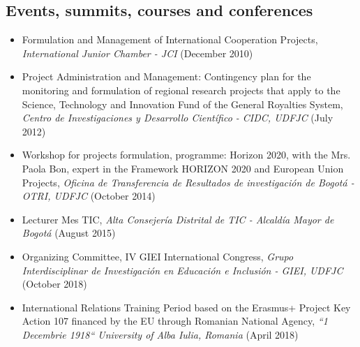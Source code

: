 \documentclass[overlapped,line,final]{../../templates/MichaelDeCorteCV/lib/res}
\begin{document}
\begin{resume}
\section{\sc Events, summits, courses and conferences}
\vspace{0.5cm}
\begin{itemize}
	\item Formulation and Management of International Cooperation Projects, \textit{International Junior Chamber - JCI} (December 2010) \href{https://raw.githubusercontent.com/dtorot/NemqCV/profile-engineer/latex/docs/JCI24hr2-3-4-Dic2010.pdf}{}
	\item Project Administration and Management: Contingency plan for the monitoring and formulation of regional research projects that apply to the Science, Technology and Innovation Fund of the General Royalties System, \textit{Centro de Investigaciones y Desarrollo Científico - CIDC, UDFJC} (July 2012) \href{https://raw.githubusercontent.com/dtorot/NemqCV/profile-engineer/latex/docs/UDFJC-CIDC-CursoTallerGestProyRegalias16Jun-7Jul2012.pdf}{}
	\item Workshop for projects formulation, programme: Horizon 2020, with the Mrs. Paola Bon, expert in the Framework HORIZON 2020 and European Union Projects, \textit{Oficina de Transferencia de Resultados de investigación de Bogotá - OTRI, UDFJC} (October 2014) \href{https://raw.githubusercontent.com/dtorot/NemqCV/profile-engineer/latex/docs/UDFJC-CIDC-WorkshopFormProjHorizon2020-24hr-29-30-31Oct2014.pdf}{}
	\item Lecturer Mes TIC, \textit{Alta Consejería Distrital de TIC - Alcaldía Mayor de Bogotá} (August 2015) \href{https://raw.githubusercontent.com/dtorot/NemqCV/profile-engineer/latex/docs/dttConfAlcaldia2015.JPG}{}
	\item Organizing Committee, IV GIEI International Congress, \textit{Grupo Interdisciplinar de Investigación en Educación e Inclusión - GIEI, UDFJC} (October 2018) \href{https://raw.githubusercontent.com/dtorot/NemqCV/profile-engineer/latex/docs/UDFJC-IVGIEI-NEES-AcademicCommittee3-4-5-Oct2018.pdf}{}
	\item International Relations Training Period based on the Erasmus+ Project Key Action 107 financed by the EU through Romanian National Agency, \textit{``1 Decembrie 1918`` University of Alba Iulia, Romania} (April 2018) \href{https://raw.githubusercontent.com/dtorot/NemqCV/profile-engineer/latex/docs/UDFJC-ERASMUS-ROMANIA-TrainingPeriod22-28Abr2018.pdf}{}

\end{itemize}
\end{resume}
\end{document}
